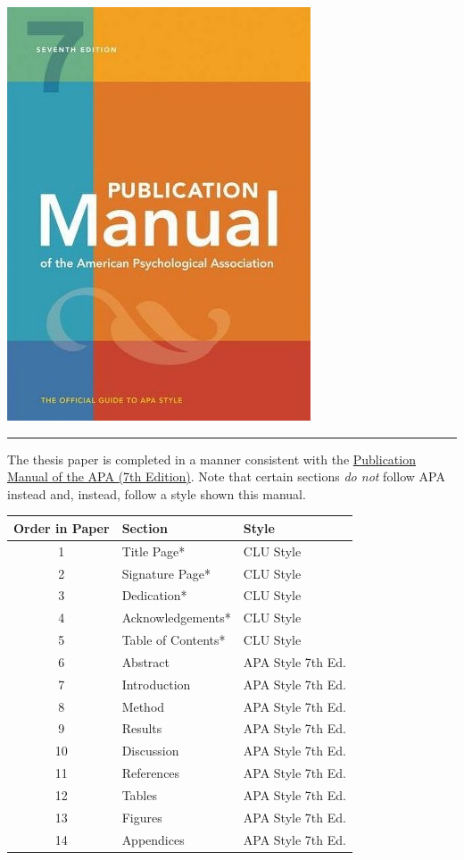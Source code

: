 \documentclass[openany]{book}
\begin{document}
\includegraphics{images/apamanual.png}

\begin{center}\rule{0.5\linewidth}{0.5pt}\end{center}

The thesis paper is completed in a manner consistent with the \href{https://www.amazon.com/s?k=apa+publication+manual+7th+edition\&crid=7T10VJ2PYQZH\&sprefix=apa+pu\%2Caps\%2C261\&ref=nb_sb_ss_i_1_6}{Publication Manual of the APA (7th Edition)}. Note that certain sections \emph{do not} follow APA instead and, instead, follow a style shown this manual.

\begin{longtable}[]{@{}cll@{}}
\toprule
Order in Paper & Section & Style\tabularnewline
\midrule
\endhead
1 & Title Page* & CLU Style\tabularnewline
2 & Signature Page* & CLU Style\tabularnewline
3 & Dedication* & CLU Style\tabularnewline
4 & Acknowledgements* & CLU Style\tabularnewline
5 & Table of Contents* & CLU Style\tabularnewline
6 & Abstract & APA Style 7th Ed.\tabularnewline
7 & Introduction & APA Style 7th Ed.\tabularnewline
8 & Method & APA Style 7th Ed.\tabularnewline
9 & Results & APA Style 7th Ed.\tabularnewline
10 & Discussion & APA Style 7th Ed.\tabularnewline
11 & References & APA Style 7th Ed.\tabularnewline
12 & Tables & APA Style 7th Ed.\tabularnewline
13 & Figures & APA Style 7th Ed.\tabularnewline
14 & Appendices & APA Style 7th Ed.\tabularnewline
\bottomrule
\end{longtable}
\end{document}
